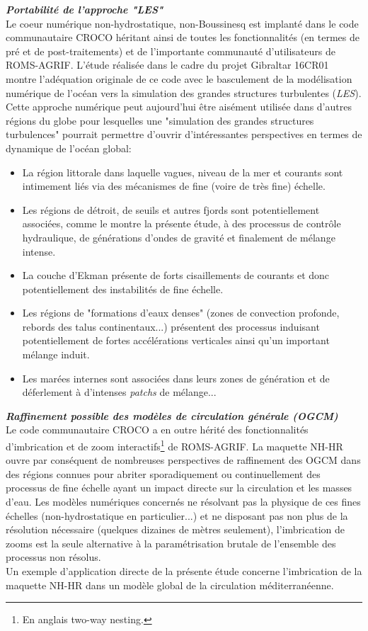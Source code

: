 \documentclass[a4paper,11pt]{report}
\begin{document}
\noindent\textit{\textbf{Portabilité de l'approche "LES"}}\\
Le coeur numérique non-hydrostatique, non-Boussinesq est implanté dans le code communautaire CROCO héritant ainsi de toutes les fonctionnalités (en termes de pré et de post-traitements) et de l'importante communauté d'utilisateurs de ROMS-AGRIF. L'étude réalisée dans le cadre du projet Gibraltar 16CR01 montre l'adéquation originale de ce code avec le basculement de la modélisation numérique de l'océan vers la simulation des grandes structures turbulentes (\textit{LES}). Cette approche numérique peut aujourd'hui être aisément utilisée dans d'autres régions du globe pour lesquelles une "simulation des grandes structures turbulences" pourrait permettre d'ouvrir d'intéressantes perspectives en termes de dynamique de l'océan global:
\begin{itemize}
	\item La région littorale dans laquelle vagues, niveau de la mer et courants sont intimement liés via des mécanismes de fine (voire de très fine) échelle.
	\item Les régions de détroit, de seuils et autres fjords sont potentiellement associées, comme le montre la présente étude, à des processus de contrôle hydraulique, de générations d'ondes de gravité et finalement de mélange intense.
	\item La couche d'Ekman présente de forts cisaillements de courants et donc potentiellement des instabilités de fine échelle.
	\item Les régions de "formations d'eaux denses" (zones de convection profonde, rebords des talus continentaux...) présentent des processus induisant potentiellement de fortes accélérations verticales ainsi qu'un important mélange induit.
	\item Les marées internes sont associées dans leurs zones de génération et de déferlement à d'intenses \textit{patchs} de mélange...
\end{itemize}

\noindent\textit{\textbf{Raffinement possible des modèles de circulation générale (OGCM)}}\\
Le code communautaire CROCO a en outre hérité des fonctionnalités d'imbrication et de zoom interactifs\footnote{En anglais two-way nesting.} de ROMS-AGRIF. La maquette NH-HR ouvre par conséquent de nombreuses perspectives de raffinement des OGCM dans des régions connues pour abriter sporadiquement ou continuellement des processus de fine échelle ayant un impact directe sur la circulation et les masses d'eau. Les modèles numériques concernés ne résolvant pas la physique de ces fines échelles (non-hydrostatique en particulier...) et ne disposant pas non plus de la résolution nécessaire (quelques dizaines de mètres seulement), l'imbrication de zooms est la seule alternative à la paramétrisation brutale de l'ensemble des processus non résolus.\\
Un exemple d'application directe de la présente étude concerne l'imbrication de la maquette NH-HR dans un modèle global de la circulation méditerranéenne.\\
 
\end{document}
